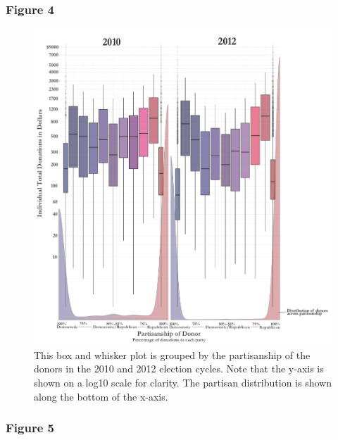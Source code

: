 \documentclass[12pt,]{article}
\begin{document}
\newpage

\hypertarget{figure-4}{%
\subsubsection{Figure 4}\label{figure-4}}

\begin{figure}
\includegraphics[width=0.9\linewidth]{../figures/fig4} \caption{This box and whisker plot is grouped by the partisanship of the donors in the 2010 and 2012 election cycles. Note that the y-axis is shown on a log10 scale for clarity. The partisan distribution is shown along the bottom of the x-axis.}\label{fig:unnamed-chunk-13}
\end{figure}

\newpage

\hypertarget{figure-5}{%
\subsubsection{Figure 5}\label{figure-5}}
\end{document}
